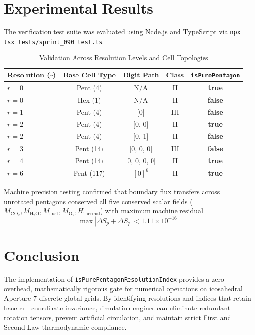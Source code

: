 \documentclass[10pt,journal,compsoc]{IEEEtran}
\begin{document}
\section{Experimental Results}
The verification test suite was evaluated using Node.js and TypeScript via \texttt{npx tsx tests/sprint\_090.test.ts}.

\begin{table}[ht]
\centering
\caption{Validation Across Resolution Levels and Cell Topologies}
\label{tab:results}
\begin{tabular}{lcccc}
\toprule
Resolution ($r$) & Base Cell Type & Digit Path & Class & \texttt{isPurePentagon} \\
\midrule
$r=0$ & Pent (4) & N/A & II & \textbf{true} \\
$r=0$ & Hex (1)  & N/A & II & \textbf{false} \\
$r=1$ & Pent (4) & [0] & III & \textbf{false} \\
$r=2$ & Pent (4) & [0, 0] & II & \textbf{true} \\
$r=2$ & Pent (4) & [0, 1] & II & \textbf{false} \\
$r=3$ & Pent (14) & [0, 0, 0] & III & \textbf{false} \\
$r=4$ & Pent (14) & [0, 0, 0, 0] & II & \textbf{true} \\
$r=6$ & Pent (117) & $[0]^6$ & II & \textbf{true} \\
\bottomrule
\end{tabular}
\end{table}

Machine precision testing confirmed that boundary flux transfers across unrotated pentagons conserved all five conserved scalar fields ($M_{\mathrm{CO_2}}, M_{\mathrm{H_2O}}, M_{\mathrm{dust}}, M_{\mathrm{O_2}}, H_{\mathrm{thermal}}$) with maximum machine residual:
\begin{equation}
\max | \Delta S_p + \Delta S_q | < 1.11 \times 10^{-16}
\end{equation}

\section{Conclusion}
The implementation of \texttt{isPurePentagonResolutionIndex} provides a zero-overhead, mathematically rigorous gate for numerical operations on icosahedral Aperture-7 discrete global grids. By identifying resolutions and indices that retain base-cell coordinate invariance, simulation engines can eliminate redundant rotation tensors, prevent artificial circulation, and maintain strict First and Second Law thermodynamic compliance.
\end{document}
